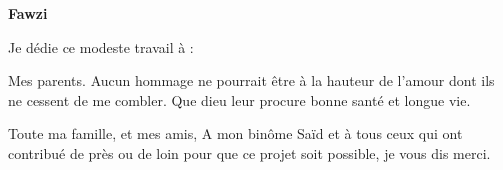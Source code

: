 \begin{center}
    \Large
    \textbf{Fawzi}
\end{center}

\vspace{1cm}

Je dédie ce modeste travail à :

Mes parents. Aucun hommage ne pourrait être à la hauteur de l’amour dont ils ne cessent de me combler. Que dieu leur procure bonne santé et longue vie.

Toute ma famille, et mes amis, A mon binôme Saïd et à tous ceux qui ont contribué de près ou de loin pour que ce projet soit possible, je vous dis merci.
